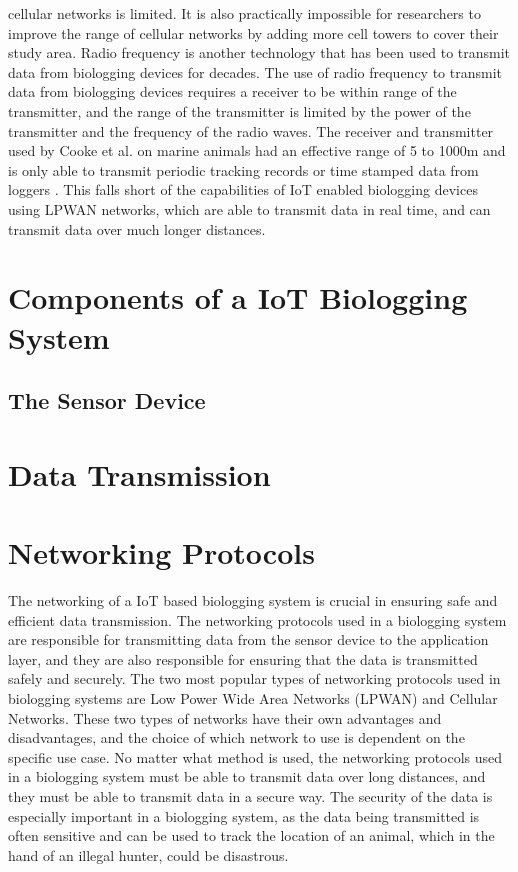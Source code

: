 \documentclass[sigplan,screen,nonacm]{acmart}
\begin{document}
cellular networks is limited. It is also practically impossible for researchers
to improve the range of cellular networks by adding more cell towers to cover
their study area. Radio frequency is another technology that has been used to
transmit data from biologging devices for decades. The use of radio frequency
to transmit data from biologging devices requires a receiver to be within range
of the transmitter, and the range of the transmitter is limited by the power of
the transmitter and the frequency of the radio waves. The receiver and transmitter
used by Cooke et al. on marine animals had an effective range of 5 to 1000m and 
is only able to transmit periodic tracking records or time stamped data from loggers
\cite{cooke2012biotelemetry}. This falls short of the capabilities of IoT enabled 
biologging devices using LPWAN networks, which are able to transmit data in real time, and can transmit 
data over much longer distances. 

\section{Components of a IoT Biologging System}
\label{sec:Components of a IoT Biologging Device}

\subsection{The Sensor Device}
\label{subsec:The Sensor Device}


\section{Data Transmission}
\label{sec:Data Transmission}

\section{Networking Protocols}
\label{sec:Networking Protocols}

The networking of a IoT based biologging system is crucial in ensuring safe and
efficient data transmission. The networking protocols used in a biologging system
are responsible for transmitting data from the sensor device to the application
layer, and they are also responsible for ensuring that the data is transmitted
safely and securely. The two most popular types of networking protocols used in
biologging systems are Low Power Wide Area Networks (LPWAN) and Cellular Networks.
These two types of networks have their own advantages and disadvantages, and
the choice of which network to use is dependent on the specific use case. No
matter what method is used, the networking protocols used in a biologging system
must be able to transmit data over long distances, and they must be able to
transmit data in a secure way. The security of the data is especially important
in a biologging system, as the data being transmitted is often sensitive and
can be used to track the location of an animal, which in the hand of an illegal
hunter, could be disastrous.
\end{document}
